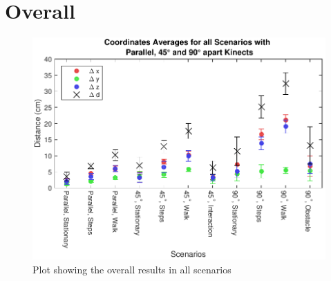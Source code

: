 \section{Overall}
\label{sec:results_overall}

\begin{figure}[!h]
  \centering

  \includegraphics[width=0.8\linewidth]{figs/Coordinates_All}

  \caption{Plot showing the overall results in all scenarios}

  \label{fig:results_overall}
\end{figure}

